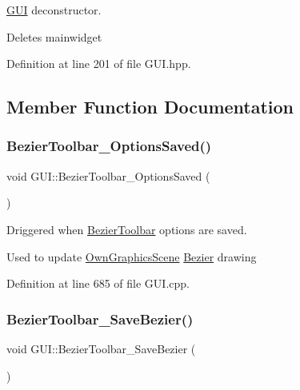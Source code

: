\mbox{\hyperlink{classGUI}{G\+UI}} deconstructor. 

Deletes mainwidget 

Definition at line 201 of file G\+U\+I.\+hpp.



\subsection{Member Function Documentation}
\mbox{\label{classGUI_a593ffaac7d8a664f20893aed2536988b}} 
\subsubsection{\texorpdfstring{Bezier\+Toolbar\+\_\+\+Options\+Saved()}{BezierToolbar\_OptionsSaved()}}
{\footnotesize\ttfamily void G\+U\+I\+::\+Bezier\+Toolbar\+\_\+\+Options\+Saved (\begin{DoxyParamCaption}{ }\end{DoxyParamCaption})}



Driggered when \mbox{\hyperlink{structBezierToolbar}{Bezier\+Toolbar}} options are saved. 

Used to update \mbox{\hyperlink{classOwnGraphicsScene}{Own\+Graphics\+Scene}} \mbox{\hyperlink{classBezier}{Bezier}} drawing 

Definition at line 685 of file G\+U\+I.\+cpp.

\mbox{\label{classGUI_a6f27f73cf15f18dfa206630cc77bc7df}} 
\subsubsection{\texorpdfstring{Bezier\+Toolbar\+\_\+\+Save\+Bezier()}{BezierToolbar\_SaveBezier()}}
{\footnotesize\ttfamily void G\+U\+I\+::\+Bezier\+Toolbar\+\_\+\+Save\+Bezier (\begin{DoxyParamCaption}{ }\end{DoxyParamCaption})}



